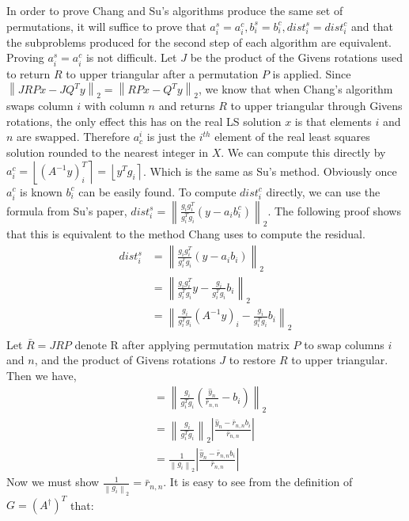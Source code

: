 \documentclass[11pt]{article}	%
\numberwithin{algorithm}{section}
\begin{document}
In order to prove Chang and Su's algorithms produce the same set of
permutations, it will suffice to prove that $a_i^s = a_i^c, b_i^s = b_i^c,
dist_i^s = dist_i^c$ and that the subproblems produced for the second step of
each algorithm are equivalent. Proving $a_i^s = a_i^c$ is not difficult.
Let $J$ be the product of the Givens rotations used to return $R$ to upper
triangular after a permutation $P$ is applied. Since $\left\| JRPx - JQ^Ty
\right \|_2 = \left \| RPx - Q^Ty \right \|_2$, we
know that when Chang's algorithm swaps column $i$ with column $n$ and returns
$R$ to upper triangular through Givens rotations, the only effect this has on
the real LS solution $x$ is that elements $i$ and $n$ are swapped. Therefore
$a^i_c$ is just the $i^{th}$ element of the real least squares solution rounded
to the nearest integer in $X$. We can compute this directly by $a_i^c= \left
\lfloor (A^{-1}y)^T_i \right \rceil = \left \lfloor y^Tg_i \right \rceil$.
Which is the same as Su's method. Obviously once $a_i^c$ is known $b_i^c$ can be
easily found. To compute $dist_i^c$ directly, we can use the formula from Su's
paper, $dist_i^s = \left \| \frac{g_ig_i^T}{g_i^Tg_i}(y-a_ib_i^c) \right \|_2$.
The following proof shows that this is equivalent to the method Chang uses to
compute the residual.
\begin{align*}
 dist_i^s&=\left \| \frac{g_ig_i^T}{g_i^Tg_i}(y-a_ib_i) \right \|_2\\
&=\left \| \frac{g_ig_i^T}{g_i^Tg_i}y - \frac{g_i}{g_i^Tg_i}b_i \right \|_2\\
&=\left \| \frac{g_i}{g_i^Tg_i}(A^{-1}y)_i - \frac{g_i}{g_i^Tg_i}b_i \right
\|_2\\
\end{align*}
Let $\bar{R} = JRP$ denote R after applying permutation matrix $P$ to swap
columns $i$ and $n$, and the product of Givens rotations $J$ to restore $R$ to
upper triangular. Then we have,
\begin{align*}
&=\left \| \frac{g_i}{g_i^Tg_i}(\frac{\hat{y}_n}{\bar{r}_{n,n}} - b_i) \right
\|_2\\
&=\left \| \frac{g_i}{g_i^Tg_i}\right \|_2  \left |
\frac{\hat{y}_n-\bar{r}_{n,n}b_i}{\bar{r}_{n,n}} \right |  \\
&= \frac{1}{\left \|g_i\right \|_2}  \left |
\frac{\hat{y}_n-\bar{r}_{n,n}b_i}{\bar{r}_{n,n}} \right |
\end{align*}
Now we must show $\frac{1}{\left \|g_i \right \|_2} = \bar{r}_{n,n}$. It is
easy to see from the definition of $G = (A^\dagger)^T$ that:
\end{document}
